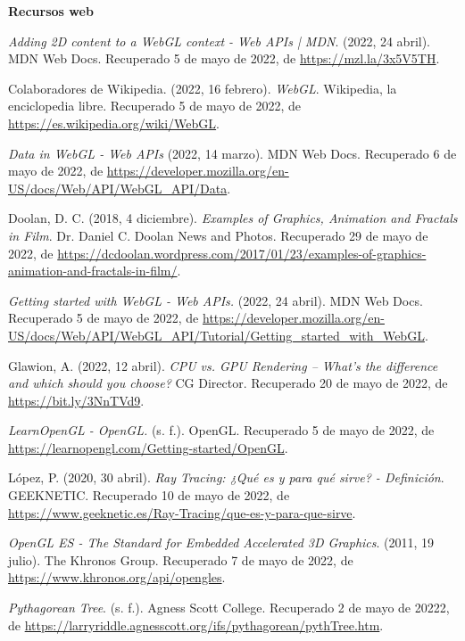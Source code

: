 \begin{thebibliography}{99}
\vspace{1cm}


\textbf{{\Large Recursos web}}

     \textit{Adding 2D content to a WebGL context - Web APIs | MDN}. (2022, 24 abril). MDN Web Docs. Recuperado 5 de mayo de 2022, de \url{https://mzl.la/3x5V5TH}.

     Colaboradores de Wikipedia. (2022, 16 febrero). \textit{WebGL}. Wikipedia, la enciclopedia libre. Recuperado 5 de mayo de 2022, de \url{https://es.wikipedia.org/wiki/WebGL}.

     \textit{Data in WebGL - Web APIs} (2022, 14 marzo). MDN Web Docs. Recuperado 6 de mayo de 2022, de \url{https://developer.mozilla.org/en-US/docs/Web/API/WebGL_API/Data}.

     Doolan, D. C. (2018, 4 diciembre). \textit{Examples of Graphics, Animation and Fractals in Film}. Dr. Daniel C. Doolan News and Photos. Recuperado 29 de mayo de 2022, de \url{https://dcdoolan.wordpress.com/2017/01/23/examples-of-graphics-animation-and-fractals-in-film/}.

     \textit{Getting started with WebGL - Web APIs.} (2022, 24 abril). MDN Web Docs. Recuperado 5 de mayo de 2022, de \url{https://developer.mozilla.org/en-US/docs/Web/API/WebGL_API/Tutorial/Getting_started_with_WebGL}.


     Glawion, A. (2022, 12 abril). \textit{CPU vs. GPU Rendering – What’s the difference and which should you choose?} CG Director. Recuperado 20 de mayo de 2022, de \url{https://bit.ly/3NnTVd9}.

     \textit{LearnOpenGL - OpenGL.} (s. f.). OpenGL. Recuperado 5 de mayo de 2022, de \url{https://learnopengl.com/Getting-started/OpenGL}.

     López, P. (2020, 30 abril). \textit{Ray Tracing: ¿Qué es y para qué sirve? - Definición}. GEEKNETIC. Recuperado 10 de mayo de 2022, de \url{https://www.geeknetic.es/Ray-Tracing/que-es-y-para-que-sirve}.

     \textit{OpenGL ES - The Standard for Embedded Accelerated 3D Graphics}. (2011, 19 julio). The Khronos Group. Recuperado 7 de mayo de 2022, de \url{https://www.khronos.org/api/opengles}.

     \textit{Pythagorean Tree}. (s. f.). Agness Scott College. Recuperado 2 de mayo de 20222, de \url{https://larryriddle.agnesscott.org/ifs/pythagorean/pythTree.htm}.



\end{thebibliography}
